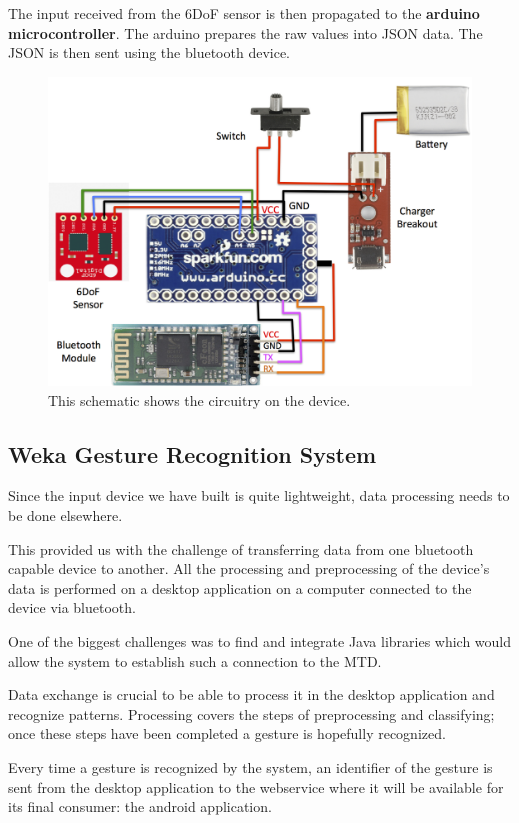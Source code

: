 The input received from the 6DoF sensor is then propagated to the \textbf{arduino microcontroller}.
The arduino prepares the raw  values into JSON data. The JSON is then sent using the bluetooth device.

\begin{figure}[!h]
\centering
\includegraphics[width=1\columnwidth]{img/device_schematic}
\caption{This schematic shows the circuitry on the device.}
\label{fig:figure1}
\end{figure}

\subsection{Weka Gesture Recognition System}
Since the input device we have built is quite lightweight, data processing needs to be done elsewhere.

This provided us with the challenge of transferring data from one bluetooth capable device to another.
All the processing and preprocessing of the device's data is performed on a desktop application on a 
computer connected to the device via bluetooth.

One of the biggest challenges was to find and integrate Java libraries which would allow the system to establish such a  
connection to the MTD.

Data exchange is crucial to be able to process it in the desktop application and recognize patterns.
Processing covers the steps of preprocessing and classifying; once these steps have been completed a gesture is hopefully recognized.


Every time a gesture is recognized by the system, an identifier of the gesture is sent from the desktop application to the webservice where it will be available for its final consumer: the android application.



